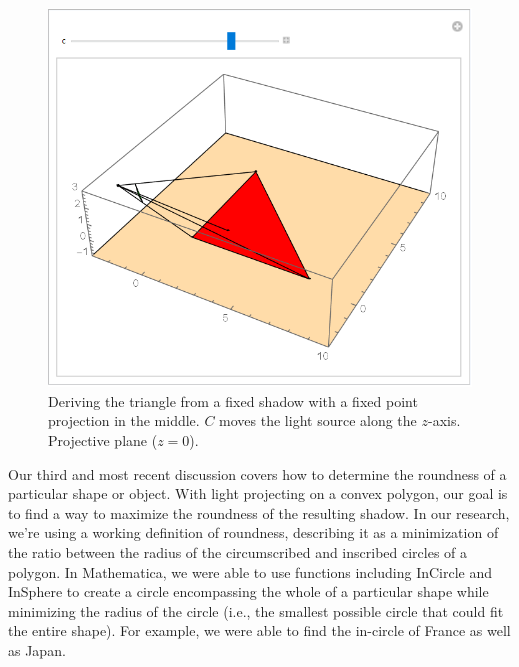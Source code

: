 \documentclass[11pt]{extarticle}
\begin{document}
    \begin{figure}[!ht]
        \centering
        \includegraphics[scale=.5]{ma_triangle.png}
        \caption{Deriving the triangle from a fixed shadow with a fixed point projection in the middle. $C$ moves the light source along the $z$-axis. Projective plane ($z = 0$).}
    \end{figure}

	Our third and most recent discussion covers how to determine the roundness of a particular shape or object. With light projecting on a convex polygon, our goal is to find a way to maximize the roundness of the resulting shadow. In our research, we’re using a working definition of roundness, describing it as a minimization of the ratio between the radius of the circumscribed and inscribed circles of a polygon. In Mathematica, we were able to use functions including InCircle and InSphere to create a circle encompassing the whole of a particular shape while minimizing the radius of the circle (i.e., the smallest possible circle that could fit the entire shape). For example, we were able to find the in-circle of France as well as Japan.
\end{document}
